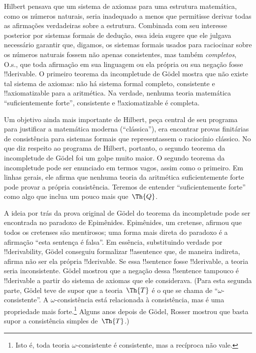 \documentclass[../../../include/open-logic-section]{subfiles}
\begin{document}


Hilbert pensava que um sistema de axiomas para uma estrutura matemática,
como os números naturais, seria inadequado a menos que permitisse derivar
todas as afirmações verdadeiras sobre a estrutura. Combinada com seu
interesse posterior por sistemas formais de dedução, essa ideia sugere que
ele julgava necessário garantir que, digamos, os sistemas formais usados
para raciocinar sobre os números naturais fossem não apenas consistentes,
mas também \emph{completos}, O.s.\@, que toda afirmação em sua linguagem ou
ela própria ou sua negação fosse !!{derivable}. O primeiro teorema da
incompletude de G\"odel mostra que não existe tal sistema de axiomas: não há
sistema formal completo, consistente e !!{axiomatizable} para a aritmética.
Na verdade, nenhuma teoria matemática ``suficientemente forte'',
consistente e !!{axiomatizable} é completa.

Um objetivo ainda mais importante de Hilbert, peça central de seu programa
para justificar a matemática moderna (``clássica''), era encontrar provas
finitárias de consistência para sistemas formais que representassem o
raciocínio clássico. No que diz respeito ao programa de Hilbert, portanto,
o segundo teorema da incompletude de G\"odel foi um golpe muito maior. O
segundo teorema da incompletude pode ser enunciado em termos vagos, assim
como o primeiro. Em linhas gerais, ele afirma que nenhuma teoria da
aritmética suficientemente forte pode provar a própria consistência.
Teremos de entender ``suficientemente forte'' como algo que inclua um pouco
mais que~$\Th{Q}$.

A ideia por trás da prova original de G\"odel do teorema da incompletude
pode ser encontrada no paradoxo de Epimênides. Epimênides, um cretense,
afirmou que todos os cretenses são mentirosos; uma forma mais direta do
paradoxo é a afirmação ``esta sentença é falsa''. Em essência, substituindo
verdade por !!{derivability}, G\"odel conseguiu formalizar !!a{sentence}
que, de maneira indireta, afirma não ser ela própria !!{derivable}. Se essa
!!{sentence} fosse !!{derivable}, a teoria seria inconsistente. G\"odel
mostrou que a negação dessa !!{sentence} tampouco é !!{derivable} a partir
do sistema de axiomas que ele considerava. (Para esta segunda parte, G\"odel
teve de supor que a teoria~$\Th{T}$ é o que se chama de
``$\omega$-consistente''. A $\omega$-consistência está relacionada à
consistência, mas é uma propriedade mais forte.\footnote{Isto é, toda teoria
$\omega$-consistente é consistente, mas a recíproca não vale.} Alguns anos
depois de G\"odel, Rosser mostrou que basta supor a consistência simples
de~$\Th{T}$.)
\end{document}
